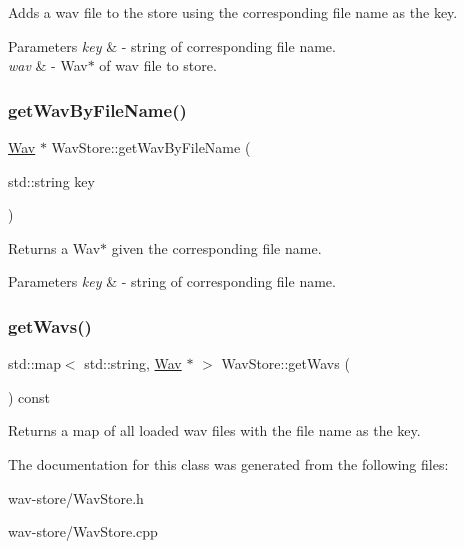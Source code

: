 Adds a wav file to the store using the corresponding file name as the key. 
\begin{DoxyParams}{Parameters}
{\em key} & -\/ string of corresponding file name. \\
\hline
{\em wav} & -\/ Wav$\ast$ of wav file to store. \\
\hline
\end{DoxyParams}
\mbox{\label{classWavStore_a7288434f1eeb9e026e3cb5aea92dc95b}} 
\subsubsection{\texorpdfstring{get\+Wav\+By\+File\+Name()}{getWavByFileName()}}
{\footnotesize\ttfamily \hyperlink{classWav}{Wav} $\ast$ Wav\+Store\+::get\+Wav\+By\+File\+Name (\begin{DoxyParamCaption}\item[{std\+::string}]{key }\end{DoxyParamCaption})}

Returns a Wav$\ast$ given the corresponding file name. 
\begin{DoxyParams}{Parameters}
{\em key} & -\/ string of corresponding file name. \\
\hline
\end{DoxyParams}
\mbox{\label{classWavStore_a859da99c5b79ff98c0582fee694bf28c}} 
\subsubsection{\texorpdfstring{get\+Wavs()}{getWavs()}}
{\footnotesize\ttfamily std\+::map$<$ std\+::string, \hyperlink{classWav}{Wav} $\ast$ $>$ Wav\+Store\+::get\+Wavs (\begin{DoxyParamCaption}{ }\end{DoxyParamCaption}) const}

Returns a map of all loaded wav files with the file name as the key. 

The documentation for this class was generated from the following files\+:\begin{DoxyCompactItemize}
\item 
wav-\/store/Wav\+Store.\+h\item 
wav-\/store/Wav\+Store.\+cpp\end{DoxyCompactItemize}
